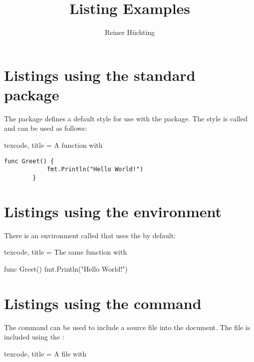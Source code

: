 \documentclass{scrartcl}
\title{Listing Examples}
\author{Reiner Hüchting}
\begin{document}
    
\section*{Listings using the standard  package}

The  package defines a default style for use with the  package.
The style is called  and can be used as follows:

\begin{tcblisting}{texcode, title = A  function with }
    \begin{lstlisting}[style=defaultlistingstyle]
        func Greet() {
            fmt.Println("Hello World!")
        }
    \end{lstlisting}
\end{tcblisting}

\section*{Listings using the  environment}

There is an environment called  that uses the
 by default:

\begin{tcblisting}{texcode, title = The same  function with }
    \begin{src2listing}[title = Greet function in \code{Go}]
func Greet() {
    fmt.Println("Hello World!")
}
    \end{src2listing}
\end{tcblisting}

\section*{Listings using the  command}

The  command can be used to include a source file
into the document. The file is included using the :

\begin{tcblisting}{texcode, title = A  file with }
\end{tcblisting}
\end{document}
